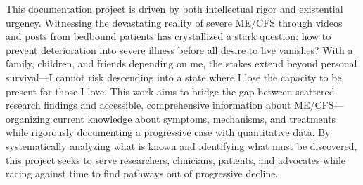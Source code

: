This documentation project is driven by both intellectual rigor and existential urgency. Witnessing the devastating reality of severe ME/CFS through videos and posts from bedbound patients has crystallized a stark question: how to prevent deterioration into severe illness before all desire to live vanishes? With a family, children, and friends depending on me, the stakes extend beyond personal survival---I cannot risk descending into a state where I lose the capacity to be present for those I love. This work aims to bridge the gap between scattered research findings and accessible, comprehensive information about ME/CFS---organizing current knowledge about symptoms, mechanisms, and treatments while rigorously documenting a progressive case with quantitative data. By systematically analyzing what is known and identifying what must be discovered, this project seeks to serve researchers, clinicians, patients, and advocates while racing against time to find pathways out of progressive decline.


